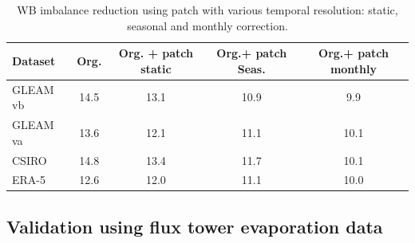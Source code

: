 \documentclass[draft]{agujournal2019}
\begin{document}
\begin{table}[h]
\centering
\begin{scriptsize}
\begin{tabular} {l c c c c}
\hline
Dataset & Org. &   Org. + patch static &  Org.+ patch Seas. &  Org.+ patch monthly \\
\hline 
GLEAM vb &  14.5    &   13.1     &  10.9     &  9.9    \\
GLEAM va &   13.6   &    12.1   &  11.1     &  10.1    \\
CSIRO &   14.8   &   13.4     &   11.7    &    10.1  \\
ERA-5 &   12.6   &    12.0    &   11.1    &   10.0   \\
\hline
\end{tabular}
\end{scriptsize}
\caption{WB imbalance reduction using patch with various temporal resolution: static, seasonal and monthly correction. }
\label{table1}
\end{table}



\subsection{Validation using flux tower evaporation data}
\end{document}
